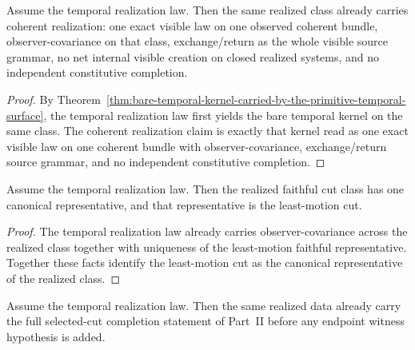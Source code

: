 \begin{theorem}
\label{thm:coherent-realization-surface-from-the-temporal-realization-law}
Assume the temporal realization law. Then the same realized class already
carries coherent realization: one exact visible law on one
observed coherent bundle, observer-covariance on that class, exchange/return
as the whole visible source grammar, no net internal visible creation on
closed realized systems, and no independent constitutive completion.
\end{theorem}

\begin{proof}
By Theorem~\ref{thm:bare-temporal-kernel-carried-by-the-primitive-temporal-surface},
the temporal realization law first yields the bare temporal kernel on the same
class. The coherent realization claim is exactly that kernel read as one
exact visible law on one coherent bundle with observer-covariance,
exchange/return source grammar, and no independent constitutive completion.
\end{proof}

\begin{theorem}
\label{thm:canonical-representative-of-the-realized-class}
Assume the temporal realization law. Then the realized faithful cut class has
one canonical representative, and that representative is the least-motion cut.
\end{theorem}

\begin{proof}
The temporal realization law already carries observer-covariance across the
realized class together with uniqueness of the least-motion faithful
representative. Together these facts identify the least-motion cut as the
canonical representative of the realized class.
\end{proof}

\begin{theorem}
\label{thm:selected-cut-closure-from-the-temporal-realization-law}
Assume the temporal realization law. Then the same realized data already
carry the full selected-cut completion statement of Part~II before any
endpoint witness hypothesis is added.
\end{theorem}


